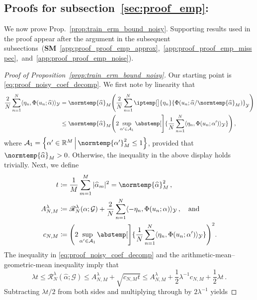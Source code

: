 \documentclass{article}
\theoremstyle{plain}
\theoremstyle{my_def}
\theoremstyle{my_rem}
\numberwithin{equation}{section}
\numberwithin{theorem}{section}%
\newcommand{\R}{\mathbb{R}}
\newcommand{\scrR}{\mathscr{R}}
\newcommand{\cA}{\mathcal{A}}
\newcommand{\cG}{\mathcal{G}}
\newcommand{\cY}{\mathcal{Y}}
\let\originalleft\left %
\let\originalright\right
\renewcommand{\left}{\mathopen{}\mathclose\bgroup\originalleft}
\renewcommand{\right}{\aftergroup\egroup\originalright}
\newcommand{\ip}{\iptemp}
\newcommand{\norm}{\normtemp}
\newcommand{\abs}{\abstemp}
\renewcommand{\hat}{\widehat}
\newcommand{\set}[2]{{\left\{ #1 \,\middle|\, #2 \right\}}}
\newcommand{\defeq}{\coloneqq} %
\newcommand{\al}{\alpha}
\def\qa{\quad\text{and}\quad}
\newcommand{\alhat}{\hat{\al}}
\begin{document}
\subsection{Proofs for subsection~\ref{sec:proof_emp}:~}\label{app:proof_proof_emp}
We now prove Prop.~\ref{prop:train_erm_bound_noisy}. Supporting results used in the proof appear after the argument in the subsequent subsections~({\bf SM}~\ref{app:proof_proof_emp_approx},~\ref{app:proof_proof_emp_misspec},~and~\ref{app:proof_proof_emp_noise}).

\begin{proof}[Proof of Proposition~\ref{prop:train_erm_bound_noisy}]\label{proof:app_proof_emp}
    Our starting point is \eqref{eq:proof_noisy_coef_decomp}. We first note by linearity that
    \begin{align*}
    \frac2N \sum_{n=1}^N \langle \eta_n, \Phi(u_n;\alhat)\rangle_{\cY}
    &=
    \norm{\alhat}_M \left(\frac2N \sum_{n=1}^N \ip[\big]{\eta_n}{\Phi(u_n;\hat{\alpha}/\norm{\alhat}_M)}_{\cY}\right)
    \\
    &\le 
    \norm{\alhat}_M \left(2\sup_{\al' \in \cA_1} \abs[\Bigg]{\frac1N \sum_{n=1}^N \langle \eta_n, \Phi(u_n;\al') \rangle_{\cY}}\right)\,,
    \end{align*}
    where $\cA_1=\set{\al'\in\R^M}{\norm{\al'}_M^2\leq 1}$, provided that $\norm{\alhat}_M>0$. Otherwise, the inequality in the above display holds trivially. Next, we define
    \begin{align}
    t &\defeq \frac1M \sum_{m=1}^M |\hat{\alpha}_m|^2 = \norm{\alhat}_M^2\,,\label{eq:app_t_alphahat}\\
    A_{N,M}^\lambda &\defeq \scrR_N^\lambda(\alpha;\cG) + \frac2N \sum_{n=1}^N \langle -\eta_n, \Phi(u_n;\alpha)\rangle_{\cY}\,,\qa\label{eq:app_anm}
    \\
    c_{N,M} &\defeq \left(2\sup_{\al' \in \cA_1} \abs[\Bigg]{\frac1N \sum_{n=1}^N \langle \eta_n, \Phi(u_n;\al') \rangle_{\cY}}\right)^2.\label{eq:app_cnm}
    \end{align}
    The inequality in \eqref{eq:proof_noisy_coef_decomp} and the arithmetic-mean--geometric-mean inequality imply that
    \begin{equation}\label{eq:app_quad_ineq}
        \lambda t \le \scrR_N^\lambda(\hat{\alpha};\cG) \le A_{N,M}^\lambda + \sqrt{c_{N,M} t}
        \le A_{N,M}^\lambda + \frac12 \lambda^{-1} c_{N,M} +  \frac12 \lambda t\,.
    \end{equation}
    Subtracting $\lambda t/2$ from both sides and multiplying through by $2\lambda^{-1}$ yields

\end{proof}
\end{document}
